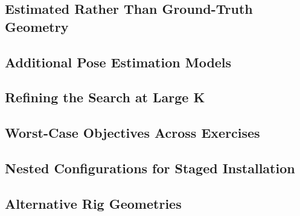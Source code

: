 \subsection{Estimated Rather Than Ground-Truth Geometry}

\subsection{Additional Pose Estimation Models}

\subsection{Refining the Search at Large K}

\subsection{Worst-Case Objectives Across Exercises}

\subsection{Nested Configurations for Staged Installation}

\subsection{Alternative Rig Geometries}
